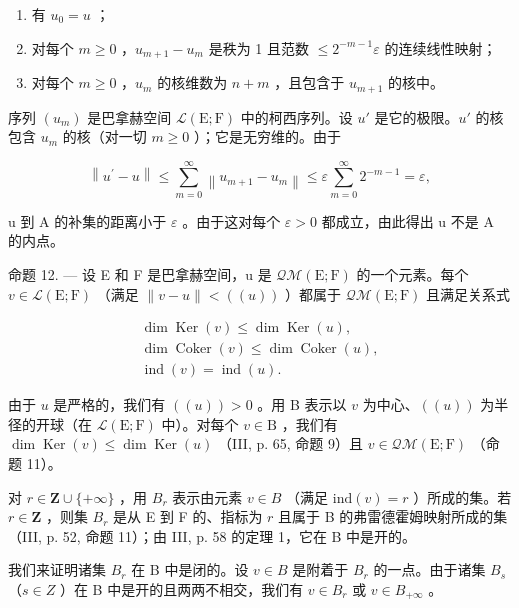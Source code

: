 \begin{enumerate}
\def\labelenumi{(\roman{enumi})}
\item
  有 \(u_{0}=u\) ；
\item
  对每个 \(m \geqslant 0\) ，\(u_{m+1} - u_m\) 是秩为 1 且范数 \(\leqslant 2^{-m-1}\varepsilon\) 的连续线性映射；
\item
  对每个 \(m \geqslant 0\) ，\(u_m\) 的核维数为 \(n + m\) ，且包含于 \(u_{m+1}\) 的核中。
\end{enumerate}

序列 \((u_{m})\) 是巴拿赫空间 \(\mathcal{L}(\mathrm{E};\mathrm{F})\) 中的柯西序列。设 \(u'\) 是它的极限。\(u'\) 的核包含 \(u_{m}\) 的核（对一切 \(m \geqslant 0\) ）；它是无穷维的。由于

\[
\left\| u ^ {\prime} - u \right\| \leqslant \sum_ {m = 0} ^ {\infty} \left\| u _ {m + 1} - u _ {m} \right\| \leqslant \varepsilon \sum_ {m = 0} ^ {\infty} 2 ^ {- m - 1} = \varepsilon ,
\]

u 到 A 的补集的距离小于 \(\varepsilon\) 。由于这对每个 \(\varepsilon > 0\) 都成立，由此得出 u 不是 A 的内点。

命题 12. --- 设 E 和 F 是巴拿赫空间，u 是 \(\mathcal{Q}\mathcal{M}(\mathrm{E};\mathrm{F})\) 的一个元素。每个 \(v \in \mathcal{L}(\mathrm{E};\mathrm{F})\) （满足 \(\|v - u\| < ((u))\) ）都属于 \(\mathcal{Q}\mathcal{M}(\mathrm{E};\mathrm{F})\) 且满足关系式

\[
\begin{array}{c} \dim \operatorname{Ker} (v) \leqslant \dim \operatorname{Ker} (u), \\ \dim \operatorname{Coker} (v) \leqslant \dim \operatorname{Coker} (u), \\ \operatorname{ind} (v) = \operatorname{ind} (u). \end{array}
\]

由于 \(u\) 是严格的，我们有 \(((u)) > 0\) 。用 B 表示以 \(v\) 为中心、\(((u))\) 为半径的开球（在 \(\mathcal{L}(\mathrm{E};\mathrm{F})\) 中）。对每个 \(v \in \mathrm{B}\) ，我们有 \(\dim \operatorname{Ker}(v) \leqslant \dim \operatorname{Ker}(u)\) （III, p. 65, 命题 9）且 \(v \in \mathcal{Q}\mathcal{M}(\mathrm{E};\mathrm{F})\) （命题 11）。

对 \(r \in \mathbf{Z} \cup \{+\infty\}\) ，用 \(B_r\) 表示由元素 \(v \in B\) （满足 \(\text{ind}(v) = r\) ）所成的集。若 \(r \in \mathbf{Z}\) ，则集 \(B_r\) 是从 E 到 F 的、指标为 \(r\) 且属于 B 的弗雷德霍姆映射所成的集（III, p. 52, 命题 11）；由 III, p. 58 的定理 1，它在 B 中是开的。

我们来证明诸集 \(B_{r}\) 在 B 中是闭的。设 \(v \in B\) 是附着于 \(B_{r}\) 的一点。由于诸集 \(B_{s}\) （\(s \in Z\) ）在 B 中是开的且两两不相交，我们有 \(v \in B_{r}\) 或 \(v \in B_{+\infty}\) 。

